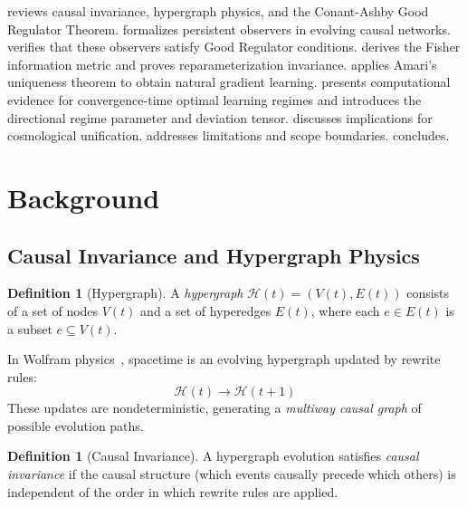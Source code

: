 \documentclass[11pt,a4paper]{article}
\theoremstyle{plain}
\theoremstyle{definition}
\newtheorem{definition}[theorem]{Definition}
\theoremstyle{remark}
\newcommand{\HG}{\mathcal{H}}
\begin{document}
 reviews causal invariance, hypergraph physics, and the Conant-Ashby Good Regulator Theorem.  formalizes persistent observers in evolving causal networks.  verifies that these observers satisfy Good Regulator conditions.  derives the Fisher information metric and proves reparameterization invariance.  applies Amari's uniqueness theorem to obtain natural gradient learning.  presents computational evidence for convergence-time optimal learning regimes and introduces the directional regime parameter and deviation tensor.  discusses implications for cosmological unification.  addresses limitations and scope boundaries.  concludes.


\section{Background}
\label{sec:background}

\subsection{Causal Invariance and Hypergraph Physics}

\begin{definition}[Hypergraph]
A \emph{hypergraph} $\HG(t) = (V(t), E(t))$ consists of a set of nodes $V(t)$ and a set of hyperedges $E(t)$, where each $e \in E(t)$ is a subset $e \subseteq V(t)$.
\end{definition}

In Wolfram physics~\cite{wolfram2020ruliad}, spacetime is an evolving hypergraph updated by rewrite rules:
\begin{equation}
\HG(t) \to \HG(t+1)
\end{equation}
These updates are nondeterministic, generating a \emph{multiway causal graph} of possible evolution paths.

\begin{definition}[Causal Invariance]
\label{def:causal_invariance}
A hypergraph evolution satisfies \emph{causal invariance} if the causal structure (which events causally precede which others) is independent of the order in which rewrite rules are applied.
\end{definition}
\end{document}
